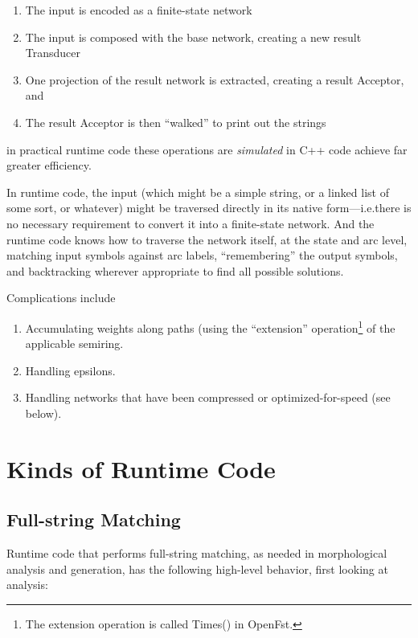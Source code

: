 \documentclass[letterpaper,12pt]{article}
\begin{document}
\begin{enumerate}
\item
The input is encoded as a finite-state network
\item
The input is composed with the base network, creating a new result Transducer
\item
One projection of the result network is extracted, creating a result Acceptor, and
\item
The result Acceptor is then ``walked'' to print out the strings
\end{enumerate}

\noindent
in practical runtime code these operations are \emph{simulated} in C++ code achieve far greater efficiency.

In runtime code, the input (which might be a simple string, or a linked list of some sort, or
whatever) might be traversed directly in its native form---i.e.\@ there is no necessary
requirement to convert it into a finite-state network.  And the runtime code knows how to
traverse the network itself, at the state and arc level, matching input symbols against arc
labels, ``remembering'' the output symbols, and backtracking wherever appropriate to find all
possible solutions.

Complications include 

\begin{enumerate}
\item
Accumulating weights along paths (using the ``extension''
operation\footnote{The extension operation is called Times() in OpenFst.} of the applicable
semiring.
\item
Handling epsilons.
\item
Handling networks that have been compressed or optimized-for-speed (see below).
\end{enumerate}

\section{Kinds of Runtime Code}

\subsection{Full-string Matching}

Runtime code that performs full-string matching, as needed in morphological analysis and generation, has the following high-level behavior, first looking
at analysis:
\end{document}
